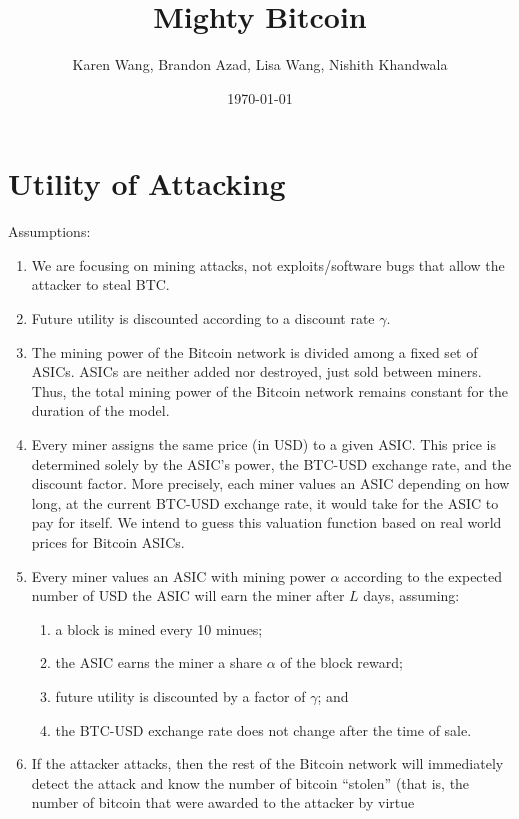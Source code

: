 \documentclass[12pt]{article}
\title{Mighty Bitcoin}
\author{Karen Wang, Brandon Azad, Lisa Wang, Nishith Khandwala}
\date{\today}
\begin{document}
\maketitle

\section{Utility of Attacking}

Assumptions:
\begin{enumerate}
  \item
    We are focusing on mining attacks, not exploits/software bugs that allow the attacker to steal BTC.
  \item
    Future utility is discounted according to a discount rate $\gamma$.
  \item
    The mining power of the Bitcoin network is divided among a fixed set of
    ASICs. ASICs are neither added nor destroyed, just sold between miners.
    Thus, the total mining power of the Bitcoin network remains constant for
    the duration of the model.
  \item
    Every miner assigns the same price (in USD) to a given ASIC. This price is
    determined solely by the ASIC's power, the BTC-USD exchange rate, and the
    discount factor.
    More precisely, each miner values an ASIC depending on how long, at the
    current BTC-USD exchange rate, it would take for the ASIC to pay for
    itself. We intend to guess this valuation function based on real world
    prices for Bitcoin ASICs.
  \item
    Every miner values an ASIC with mining power $\alpha$ according to the
    expected number of USD the ASIC will earn the miner after $L$ days, assuming:
    \begin{enumerate}
      \item
        a block is mined every 10 minues;
      \item
        the ASIC earns the miner a share $\alpha$ of the block reward;
      \item
        future utility is discounted by a factor of $\gamma$; and
      \item
        the BTC-USD exchange rate does not change after the time of sale.
    \end{enumerate}
  \item
    If the attacker attacks, then the rest of the Bitcoin network will
    immediately detect the attack and know the number of bitcoin ``stolen''
    (that is, the number of bitcoin that were awarded to the attacker by virtue

\end{enumerate}
\end{document}
